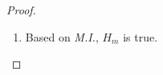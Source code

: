 \documentclass{article}
\theoremstyle{definition}\newtheorem{definition}{Definition}
\begin{document}
\begin{proof}
\begin{enumerate}
			
			\item Based on \emph{M.I.}, $H_m$ is true.

		\end{enumerate}
				
		
	\end{proof}
			
\end{document}

